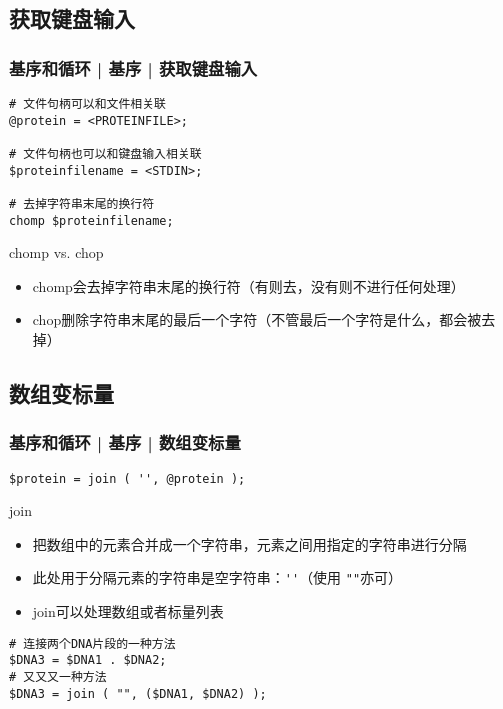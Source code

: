 \subsection{获取键盘输入}
\begin{frame}[fragile]
  \frametitle{基序和循环 | 基序 | \alert{获取键盘输入}}
\begin{lstlisting}
# 文件句柄可以和文件相关联
@protein = <PROTEINFILE>;

# 文件句柄也可以和键盘输入相关联
$proteinfilename = <STDIN>;

# 去掉字符串末尾的换行符
chomp $proteinfilename;
\end{lstlisting} 
\pause
\begin{block}{chomp vs. chop}
  \begin{itemize}
    \item chomp会去掉字符串末尾的换行符（有则去，没有则不进行任何处理）
    \item chop删除字符串末尾的最后一个字符（不管最后一个字符是什么，都会被去掉）
  \end{itemize}
\end{block}
\end{frame}

\subsection{数组变标量}
\begin{frame}[fragile]
  \frametitle{基序和循环 | 基序 | \alert{数组变标量}}
\begin{lstlisting}
$protein = join ( '', @protein );
\end{lstlisting}
\pause
\begin{block}{join}
  \begin{itemize}
    \item 把数组中的元素合并成一个字符串，元素之间用指定的字符串进行分隔
    \item 此处用于分隔元素的字符串是空字符串：\verb|''|（使用 \verb|""|亦可）
    \item join可以处理数组或者标量列表
  \end{itemize}
\end{block}
\pause
\begin{lstlisting}
# 连接两个DNA片段的一种方法
$DNA3 = $DNA1 . $DNA2;
# 又又又一种方法
$DNA3 = join ( "", ($DNA1, $DNA2) );
\end{lstlisting}
\end{frame}

